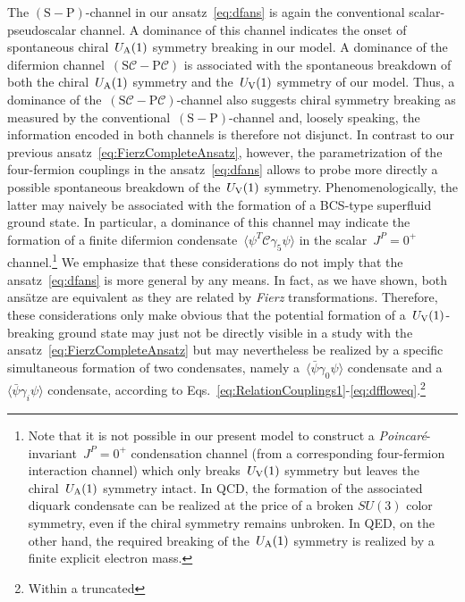 \documentclass[prd,english,preprintnumbers,amsmath,amssymb,nofootinbib,twocolumn,superscriptaddress]{revtex4-1}
\def\CC{{\mathcal C}}
\begin{document}
{{The $\left(\text{S} - \text{P} \right)$-channel in our ansatz~\eqref{eq:dfans} is again the conventional scalar-pseudoscalar channel. 
A dominance of this channel indicates the onset of spontaneous chiral~$U_{\rm A}(1)$ symmetry breaking in our model. A dominance
of the difermion channel~$( \text{S} \CC - \text{P} \CC)$ is associated with the spontaneous breakdown of 
both the chiral~$U_{\rm A}(1)$ symmetry and the~$U_{\rm V}(1)$ symmetry of our model. Thus, a 
dominance of the~$( \text{S} \CC - \text{P} \CC )$-channel also suggests chiral symmetry breaking as measured 
by the conventional~$\left(\text{S} - \text{P} \right)$-channel and, loosely speaking, the information encoded in both
channels is therefore not disjunct. In contrast to our 
previous ansatz~\eqref{eq:FierzCompleteAnsatz}, however, the parametrization of the four-fermion couplings
in the ansatz~\eqref{eq:dfans} 
allows to probe more directly a possible spontaneous breakdown
of the~$U_{\rm V}(1)$ symmetry. 
Phenomenologically, 
the latter may naively be associated with  
the formation of a BCS-type superfluid ground state. In particular, a dominance
of this channel may indicate the formation of a 
finite difermion condensate~$\langle\psi^{T}\CC\gamma_5\psi\rangle$ in the 
scalar~$J^{P}=0^{+}$ channel.\footnote{Note that it is not possible in our present model to construct 
a {\it Poincar\'{e}}-invariant~$J^{P}=0^{+}$ condensation 
channel (from a corresponding four-fermion interaction channel) which only breaks~$U_{\rm V}(1)$ symmetry but leaves the 
chiral~$U_{\rm A}(1)$ symmetry intact. In QCD, the formation of the associated 
diquark condensate can be realized at the price of a broken $SU(3)$ color symmetry, even if the chiral symmetry remains unbroken. 
In QED, on the other hand, the required
breaking of the~$U_{\rm A}(1)$ symmetry is realized by a finite explicit electron mass.} 
We emphasize that these considerations do not imply that the ansatz~\eqref{eq:dfans} is more general by any means. In fact, as we have shown,
both ans\"atze are equivalent as they are related by {\it Fierz} transformations. Therefore, {these considerations 
only make obvious that the potential
formation of a~$U_{\rm V}(1)$-breaking ground state may just not be directly visible in a study with 
the ansatz~\eqref{eq:FierzCompleteAnsatz} but may nevertheless be realized by 
a specific simultaneous formation of two condensates, 
namely a~$\langle \bar{\psi}\gamma_0\psi\rangle$ condensate 
and a~$\langle \bar{\psi}\gamma_i\psi\rangle$ condensate, according to 
Eqs.~\eqref{eq:RelationCouplings1}-\eqref{eq:dffloweq}.\footnote{Within a truncated 
}}}}
\end{document}
